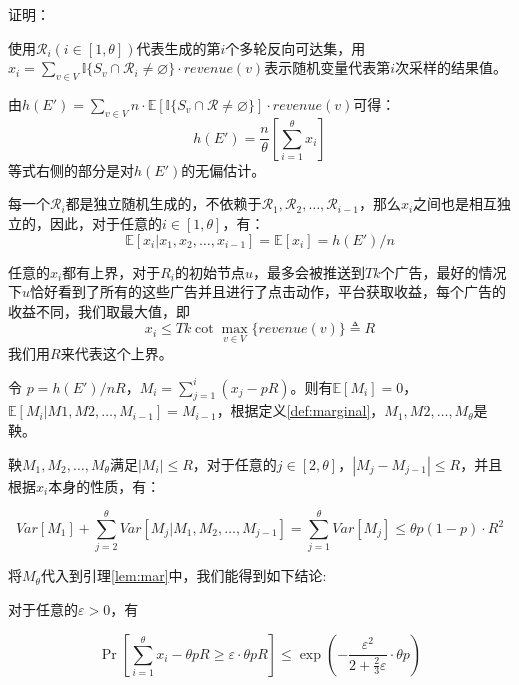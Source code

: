 证明：

使用$\mathcal{R}_i(i\in[1,\theta])$代表生成的第$i$个多轮反向可达集，用$x_i=\sum_{v\in V}\mathbb{I}\{S_v\cap\mathcal{R}_i\ne \varnothing  \}\cdot revenue(v)$表示随机变量代表第$i$次采样的结果值。

由$h(E')=\sum_{v \in V} n\cdot\mathbb{E}[\mathbb{I}\{S_v\cap \mathcal{R}\ne \varnothing \}]\cdot revenue(v)$可得：
\begin{equation}
h(E')=\frac{n}{\theta}\left[\sum_{i=1}^{\theta}x_i\right]
\end{equation}
\noindent 等式右侧的部分是对$h(E')$的无偏估计。

每一个$\mathcal{R}_i$都是独立随机生成的，不依赖于$\mathcal{R}_1,\mathcal{R}_2,\ldots,\mathcal{R}_{i-1}$，那么$x_i$之间也是相互独立的，因此，对于任意的$i\in[1,\theta]$，有：
\begin{equation}
\mathbb{E}[x_i|x_1,x_2,\ldots,x_{i-1}]=\mathbb{E}[x_i]=h(E')/n
\end{equation}

任意的$x_i$都有上界，对于$R_i$的初始节点$u$，最多会被推送到$Tk$个广告，最好的情况下$u$恰好看到了所有的这些广告并且进行了点击动作，平台获取收益，每个广告的收益不同，我们取最大值，即
\begin{equation}
x_i\le Tk\cot \max_{v\in V}\{revenue(v)\}\triangleq R
\end{equation}
\noindent 我们用$R$来代表这个上界。

令 $p=h(E')/nR$，$M_i=\sum_{j=1}^{i}(x_j-pR)$。则有$\mathbb{E}[M_i]=0$，$\mathbb{E}[M_i|M1,M2,\ldots,M_{i-1}]=M_{i-1}$，根据定义\ref{def:marginal}，$M_1,M2,\ldots,M_\theta$是鞅。

鞅$M_1,M_2,\ldots,M_\theta$满足$|M_i|\le R$，对于任意的$j\in [2,\theta]$，$|M_j-M_{j-1}|\le R$，并且根据$x_i$本身的性质，有：

\begin{equation}
    Var[M_1]+\sum_{j=2}^{\theta}Var[M_j|M_1,M_2,\ldots,M_{j-1}]=\sum_{j=1}^{\theta}Var[M_j] \le \theta p(1-p)\cdot R^2
\end{equation}

将$M_\theta$代入到引理\ref{lem:mar}中，我们能得到如下结论:

对于任意的$\varepsilon > 0$，有

\begin{equation}
\Pr\left[\sum_{i=1}^{\theta}x_i- \theta pR \ge \varepsilon \cdot \theta p R\right] \le \exp(-\frac{\varepsilon^2}{2+\frac{2}{3}\varepsilon}\cdot \theta p)
\end{equation}

